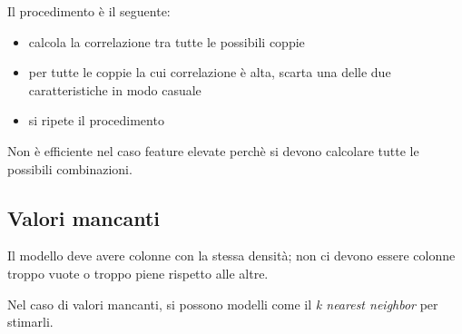 \documentclass{report}
\begin{document}
\noindent Il procedimento è il seguente:
\begin{itemize}
    \item calcola la correlazione tra tutte le possibili coppie 
    \item per tutte le coppie la cui correlazione è alta, scarta una delle due caratteristiche in modo casuale 
    \item si ripete il procedimento 
\end{itemize}

\noindent Non è efficiente nel caso feature elevate perchè si devono calcolare tutte le possibili combinazioni.

\subsection{Valori mancanti}

Il modello deve avere colonne con la stessa densità; non ci devono essere colonne troppo vuote o troppo piene rispetto alle altre.

\noindent Nel caso di valori mancanti, si possono modelli come il \textit{k nearest neighbor} per stimarli.
\end{document}
